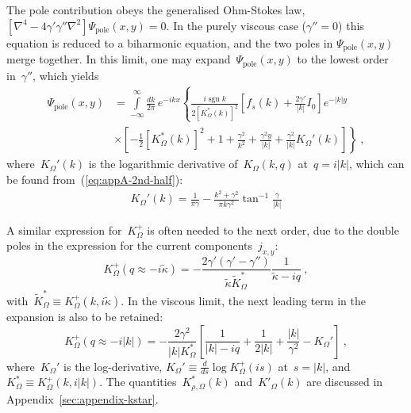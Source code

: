 \documentclass[preprint,aps,eqsecnum, prb]{revtex4-1}
\newcommand{\fplus}[1]{{#1}^{+}}
\newcommand{\sgn}{\mathop{\mathrm{sgn}}\nolimits}
\begin{document}
The pole contribution obeys the generalised Ohm-Stokes law,
$\left[\nabla^4 - 4\gamma' \gamma'' \nabla^2 \right]
\Psi_\mathrm{pole}(x, y) = 0$. In the purely viscous case ($\gamma'' = 0$)
this equation is reduced to a biharmonic equation, and the two poles in
$\Psi_\mathrm{pole}(x, y)$ merge together.  In this limit, one may
expand~$\Psi_\mathrm{pole}(x,y)$ to the lowest order in~$\gamma''$, which
yields
\begin{align}
  \Psi_\mathrm{pole}(x, y) &= \int\limits_{-\infty}^{\infty}
  \frac{dk}{2\pi}\, e^{-ikx} \left\{ 
  \frac{i \sgn k}{2\left[K_\Omega^\ast(k)\right]^2}
  \left[f_s(k) + \frac{2\gamma'}{|k|} I_0 \right]
  e^{-|k|y} \right. \\ \nonumber
  &\times \left.
    \left[
    - \frac{1}{2}\left[K_\Omega^\ast(k)\right]^2
    + 1 + \frac{\gamma^2}{k^2} + \frac{\gamma^2 y}{|k|}
    + \frac{\gamma^2}{|k|}  K_\Omega'(k)
  \right]
  \right\} \ ,  
\end{align}
where~$K_\Omega'(k)$ is the logarithmic derivative of~$K_\Omega(k, q)$
at~$q = i|k|$, which can be found from~(\ref{eq:appA-2nd-half}):
\begin{align}
  K_\Omega'(k) = \frac{1}{\pi\gamma} - \frac{k^2 + \gamma^2}{\pi k \gamma^2}
  \tan^{-1}\frac{\gamma}{|k|}
\end{align}


  



 A similar expression
for~$\fplus{K}_\Omega$ is often needed to the next order, due to the double poles in the expression for the current components~$j_{x, y}$:
\begin{equation}
\fplus{K}_\Omega(q \approx -i {\tilde \kappa})
= - \frac{2 \gamma' (\gamma' - \gamma'') }{{\tilde \kappa}
    {\tilde K}_\Omega^\ast}
     \frac{1}{{\tilde \kappa} - i q}
\ ,
\end{equation}
with~${\tilde K}_\Omega^\ast \equiv \fplus{K}_\Omega(k, i{\tilde \kappa})$.
In the viscous limit, the next leading term in the expansion
is also to be retained:
\begin{equation}
\fplus{K}_\Omega(q \approx -i |k|)
= - \frac{2 \gamma^2 }{|k| K_\Omega^\ast}
     \left[
     \frac{1}{|k| - i q}
      + \frac{1}{2|k|} + \frac{|k|}{\gamma^2} - K_\Omega'\right]
\ ,
\end{equation}
where~$K_\Omega'$ is the log-derivative,
$K_\Omega' \equiv \frac{d}{ds} \log \fplus{K}_\Omega(is)$ at~$s = |k|$,
and~$K_\Omega^\ast \equiv \fplus{K}_\Omega(k, i|k|)$.
The quantities~$K_{\rho,\Omega}^\ast(k)$ and~$K'_\Omega(k)$ are discussed
in Appendix~\ref{sec:appendix-kstar}.
\end{document}
